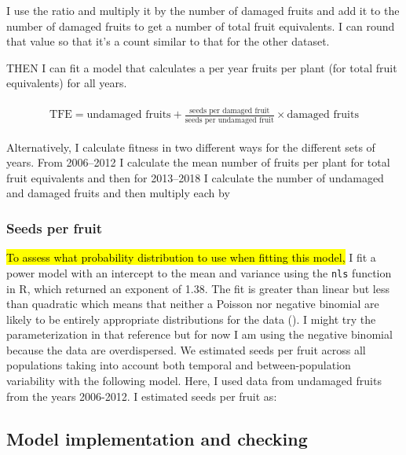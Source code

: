 \documentclass[12pt, oneside, titlepage]{article}   	%
\begin{document}
I use the ratio and multiply it by the number of damaged fruits and add it to the number of damaged fruits to get a number of total fruit equivalents. I can round that value so that it's a count similar to that for the other dataset. 

THEN I can fit a model that calculates a per year fruits per plant (for total fruit equivalents) for all years. 

%
    \begin{align}
\begin{split}
\textrm{TFE} = \textrm{undamaged fruits} + \frac{\textrm{seeds per damaged fruit}}{\textrm{seeds per undamaged fruit}}\times  \textrm{damaged fruits} 
  \end{split}
\end{align}
%

Alternatively, I calculate fitness in two different ways for the different sets of years. From 2006--2012 I calculate the mean number of fruits per plant for total fruit equivalents and then for 2013--2018 I calculate the number of undamaged and damaged fruits and then multiply each by 


\subsubsection*{Seeds per fruit}

\hl{To assess what probability distribution to use when fitting this model,} I fit a power model with an intercept to the mean and variance using the \verb|nls| function in R, which returned an exponent of 1.38. The fit is greater than linear but less than quadratic which means that neither a Poisson nor negative binomial are likely to be entirely appropriate distributions for the data (\cite{linden2011}). I might try the parameterization in that reference but for now I am using the negative binomial because the data are overdispersed. We estimated seeds per fruit across all populations taking into account both temporal and between-population variability with the following model. Here, I used data from undamaged fruits from the years 2006-2012. I estimated seeds per fruit as:

\subsection*{Model implementation and checking}
\end{document}
